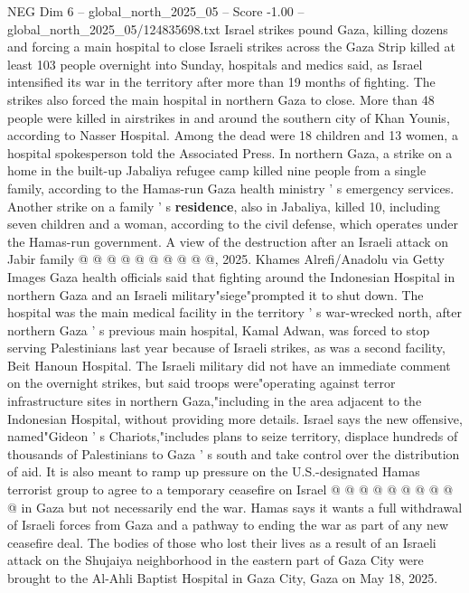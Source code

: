 \begin{textsample}{NEG Dim 6 – global\_north\_2025\_05 – Score -1.00 – global\_north\_2025\_05/124835698.txt}  \label{ex:f6_neg_412}
Israel strikes pound Gaza, killing dozens and forcing a main hospital to close Israeli strikes across the Gaza Strip killed at least 103 people overnight into Sunday, hospitals and medics said, as Israel intensified its war in the territory after more than 19 months of fighting.
The strikes also forced the main hospital in northern Gaza to close.
More than 48 people were killed in airstrikes in and around the southern city of Khan Younis, according to Nasser Hospital.
Among the dead were 18 children and 13 women, a hospital spokesperson told the Associated Press.
In northern Gaza, a strike on a home in the built-up Jabaliya refugee camp killed nine people from a single family, according to the Hamas-run Gaza health ministry ' s emergency services.
Another strike on a family ' s \textbf{residence}, also in Jabaliya, killed 10, including seven children and a woman, according to the civil defense, which operates under the Hamas-run government.
A view of the destruction after an Israeli attack on Jabir family @ @ @ @ @ @ @ @ @ @, 2025.
Khames Alrefi/Anadolu via Getty Images Gaza health officials said that fighting around the Indonesian Hospital in northern Gaza and an Israeli military"siege"prompted it to shut down.
The hospital was the main medical facility in the territory ' s war-wrecked north, after northern Gaza ' s previous main hospital, Kamal Adwan, was forced to stop serving Palestinians last year because of Israeli strikes, as was a second facility, Beit Hanoun Hospital.
The Israeli military did not have an immediate comment on the overnight strikes, but said troops were"operating against terror infrastructure sites in northern Gaza,"including in the area adjacent to the Indonesian Hospital, without providing more details.
Israel says the new offensive, named"Gideon ' s Chariots,"includes plans to seize territory, displace hundreds of thousands of Palestinians to Gaza ' s south and take control over the distribution of aid.
It is also meant to ramp up pressure on the U.S.-designated Hamas terrorist group to agree to a temporary ceasefire on Israel @ @ @ @ @ @ @ @ @ @ in Gaza but not necessarily end the war.
Hamas says it wants a full withdrawal of Israeli forces from Gaza and a pathway to ending the war as part of any new ceasefire deal.
The bodies of those who lost their lives as a result of an Israeli attack on the Shujaiya neighborhood in the eastern part of Gaza City were brought to the Al-Ahli Baptist Hospital in Gaza City, Gaza on May 18, 2025.

\end{textsample}

